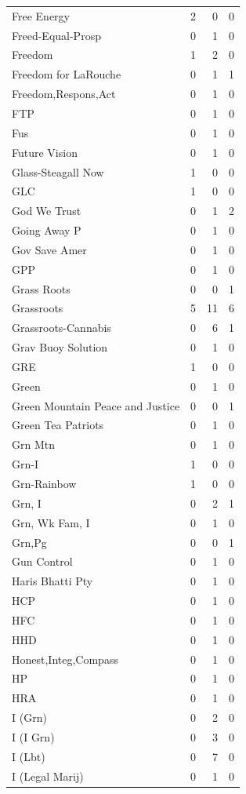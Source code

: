 \begin{supertabular}{lrrr}
Free Energy & 2 & 0 & 0\\
Freed-Equal-Prosp & 0 & 1 & 0\\
Freedom & 1 & 2 & 0\\
Freedom for LaRouche & 0 & 1 & 1\\
Freedom,Respons,Act & 0 & 1 & 0\\
FTP & 0 & 1 & 0\\
Fus & 0 & 1 & 0\\
Future Vision & 0 & 1 & 0\\
Glass-Steagall Now & 1 & 0 & 0\\
GLC & 1 & 0 & 0\\
God We Trust & 0 & 1 & 2\\
Going Away P & 0 & 1 & 0\\
Gov Save Amer & 0 & 1 & 0\\
GPP & 0 & 1 & 0\\
Grass Roots & 0 & 0 & 1\\
Grassroots & 5 & 11 & 6\\
Grassroots-Cannabis & 0 & 6 & 1\\
Grav Buoy Solution & 0 & 1 & 0\\
GRE & 1 & 0 & 0\\
Green & 0 & 1 & 0\\
Green Mountain Peace and Justice & 0 & 0 & 1\\
Green Tea Patriots & 0 & 1 & 0\\
Grn Mtn & 0 & 1 & 0\\
Grn-I & 1 & 0 & 0\\
Grn-Rainbow & 1 & 0 & 0\\
Grn, I & 0 & 2 & 1\\
Grn, Wk Fam, I & 0 & 1 & 0\\
Grn,Pg & 0 & 0 & 1\\
Gun Control & 0 & 1 & 0\\
Haris Bhatti Pty & 0 & 1 & 0\\
HCP & 0 & 1 & 0\\
HFC & 0 & 1 & 0\\
HHD & 0 & 1 & 0\\
Honest,Integ,Compass & 0 & 1 & 0\\
HP & 0 & 1 & 0\\
HRA & 0 & 1 & 0\\
I (Grn) & 0 & 2 & 0\\
I (I Grn) & 0 & 3 & 0\\
I (Lbt) & 0 & 7 & 0\\
I (Legal Marij) & 0 & 1 & 0\\

\end{supertabular}
